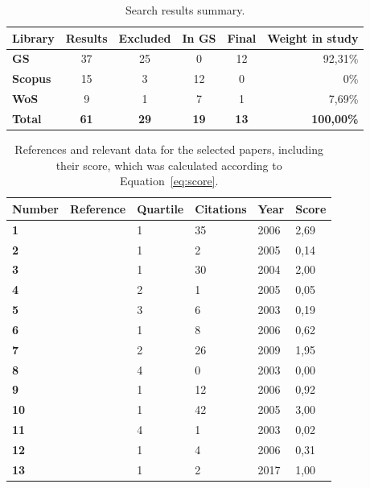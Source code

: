 \begin{table}[htb]
\centering
\caption{Search results summary.}
\label{tab:search_results}
\begin{tabular}{@{}lccccr@{}}
\toprule
\textbf{Library} & \textbf{Results} & \textbf{Excluded} & \textbf{In GS} & \textbf{Final} & \textbf{Weight in study} \\ \midrule
\textbf{GS} & 37 & 25 & 0 & 12 & 92,31\% \\
\textbf{Scopus} & 15 & 3 & 12 & 0 & 0\% \\
\textbf{WoS} & 9 & 1 & 7 & 1 & 7,69\% \\
\midrule
\textbf{Total}& \textbf{61} & \textbf{29} & \textbf{19} &\textbf{13} & \textbf{100,00\%} \\ \bottomrule
\end{tabular}
\end{table}

\begin{table}[htb]
    \centering
    \small
    \caption{References and relevant data for the selected papers,
        including their score, which was calculated according to
        Equation~\ref{eq:score}.}
    \label{tab:selected_papers}
    \begin{tabular}{@{}llllll@{}}
    \toprule
    \textbf{Number} & \textbf{Reference} & \textbf{Quartile} &
    \textbf{Citations} & \textbf{Year} & \textbf{Score} \\ \midrule
    \textbf{1} & \cite{Hartl2006} & 1 & 35 & 2006 & 2,69 \\
    \midrule
    \textbf{2} & \cite{Hartl2005} & 1 & 2 & 2005 & 0,14 \\
    \midrule
    \textbf{3} & \cite{Laepple2004} & 1 & 30 & 2004 & 2,00 \\
    \midrule
    \textbf{4} & \cite{Pundt2005} & 2 & 1 & 2005 & 0,05 \\
    \midrule
    \textbf{5} & \cite{Murphy2003} & 3 & 6 & 2003 & 0,19 \\
    \midrule
    \textbf{6} & \cite{Frins2006} & 1 & 8 & 2006 & 0,62 \\
    \midrule
    \textbf{7} & \cite{Johansson2009} & 2 & 26 & 2009 & 1,95 \\
    \midrule
    \textbf{8} & \cite{ODriscoll2003} & 4 & 0 & 2003 & 0,00 \\
    \midrule
    \textbf{9} & \cite{Pundt2006} & 1 & 12 & 2006 & 0,92 \\
    \midrule
    \textbf{10} & \cite{Pundt2005b} & 1 & 42 & 2005 & 3,00 \\
    \midrule
    \textbf{11} & \cite{ODriscoll2003a} & 4 & 1 & 2003 & 0,02 \\
    \midrule
    \textbf{12} & \cite{Mettendorf2006} & 1 & 4 & 2006 & 0,31 \\
    \midrule
    \textbf{13} & \cite{Casaballe2017} & 1 & 2 & 2017 & 1,00 \\ \bottomrule
    \end{tabular}
\end{table}

